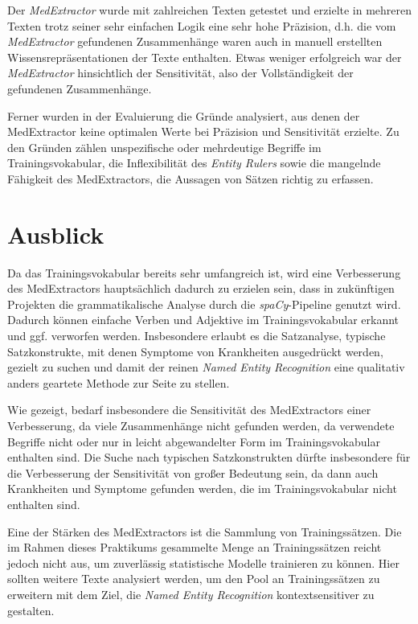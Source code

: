 Der \emph{MedExtractor} wurde mit zahlreichen Texten getestet und erzielte in mehreren Texten trotz seiner sehr einfachen Logik eine sehr hohe Präzision, d.h. die vom \emph{MedExtractor} gefundenen Zusammenhänge waren auch in manuell erstellten Wissensrepräsentationen der Texte enthalten. Etwas weniger erfolgreich war der \emph{MedExtractor} hinsichtlich der Sensitivität, also der Vollständigkeit der gefundenen Zusammenhänge.

Ferner wurden in der Evaluierung die Gründe analysiert, aus denen der MedExtractor keine optimalen Werte bei Präzision und Sensitivität erzielte. Zu den Gründen zählen unspezifische oder mehrdeutige Begriffe im Trainingsvokabular, die Inflexibilität des \emph{Entity Rulers} sowie die mangelnde Fähigkeit des MedExtractors, die Aussagen von Sätzen richtig zu erfassen.

\section{Ausblick}
\label{sec:Ausblick} 

Da das Trainingsvokabular bereits sehr umfangreich ist, wird eine Verbesserung des MedExtractors hauptsächlich dadurch zu erzielen sein, dass in zukünftigen Projekten die grammatikalische Analyse durch die \emph{spaCy}-Pipeline genutzt wird. Dadurch können einfache Verben und Adjektive im Trainingsvokabular erkannt und ggf. verworfen werden. Insbesondere erlaubt es die Satzanalyse, typische Satzkonstrukte, mit denen Symptome von Krankheiten ausgedrückt werden, gezielt zu suchen und damit der reinen \emph{Named Entity Recognition} eine qualitativ anders geartete Methode zur Seite zu stellen.

Wie gezeigt, bedarf insbesondere die Sensitivität des MedExtractors einer Verbesserung, da viele Zusammenhänge nicht gefunden werden, da verwendete Begriffe nicht oder nur in leicht abgewandelter Form im Trainingsvokabular enthalten sind. Die Suche nach typischen Satzkonstrukten dürfte insbesondere für die Verbesserung der Sensitivität von großer Bedeutung sein, da dann auch Krankheiten und Symptome gefunden werden, die im Trainingsvokabular nicht enthalten sind.

Eine der Stärken des MedExtractors ist die Sammlung von Trainingssätzen. Die im Rahmen dieses Praktikums gesammelte Menge an Trainingssätzen reicht jedoch nicht aus, um zuverlässig statistische Modelle trainieren zu können. Hier sollten weitere Texte analysiert werden, um den Pool an Trainingssätzen zu erweitern mit dem Ziel, die \emph{Named Entity Recognition} kontextsensitiver zu gestalten. 